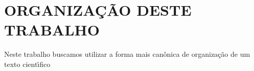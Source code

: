 \documentclass[
12pt,		%
openright,	%
twoside,  %
a4paper,			%
chapter=TITLE,		%
english,			%
french,				%
spanish,			%
brazil				%
]{USPSC-classe/USPSC_RedarTex}
\begin{document}
\begin{flushleft}
\begin{flushleft}
\begin{flushleft}
\begin{flushleft}
\begin{flushleft}
\begin{flushleft}
\begin{flushleft}
\begin{flushleft}

\end{flushleft}


\end{flushleft}


\end{flushleft}


\end{flushleft}


\end{flushleft}


\end{flushleft}


\end{flushleft}


\end{flushleft}


\begin{flushleft}
\begin{flushleft}
\begin{flushleft}
\begin{flushleft}
\begin{flushleft}
\begin{flushleft}
\begin{flushleft}
\begin{flushleft}

\end{flushleft}


\end{flushleft}


\end{flushleft}


\end{flushleft}


\end{flushleft}


\end{flushleft}


\end{flushleft}


\end{flushleft}


\chapter[ORGANIZA\c{C}\~AO DESTE TRABALHO]{ORGANIZA\c{C}\~AO DESTE TRABALHO}\label{ORGANIZA\c{C}\~AO DESTE TRABALHO}
Neste trabalho buscamos utilizar a forma mais can\^onica de organiza\c{c}\~ao de um texto cient\'{\i}fico
\end{document}
